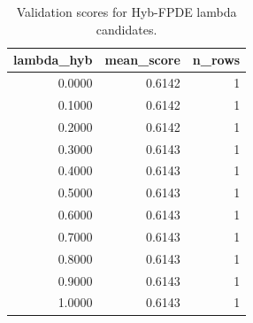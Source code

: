 \begin{table}[t]
\caption{Validation scores for Hyb-FPDE lambda candidates.}
\label{tab:lambda_distribution_computed}
\centering
\begin{tabular}{rrr}
\toprule
lambda\_hyb & mean\_score & n\_rows \\
\midrule
0.0000 & 0.6142 & 1 \\
0.1000 & 0.6142 & 1 \\
0.2000 & 0.6142 & 1 \\
0.3000 & 0.6143 & 1 \\
0.4000 & 0.6143 & 1 \\
0.5000 & 0.6143 & 1 \\
0.6000 & 0.6143 & 1 \\
0.7000 & 0.6143 & 1 \\
0.8000 & 0.6143 & 1 \\
0.9000 & 0.6143 & 1 \\
1.0000 & 0.6143 & 1 \\
\bottomrule
\end{tabular}

\end{table}
